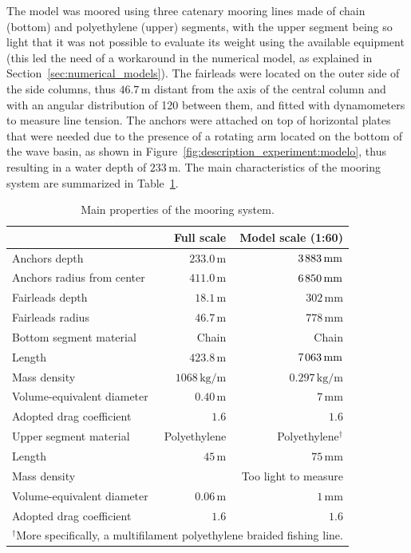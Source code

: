 The model was moored using three catenary mooring lines made of chain (bottom) and polyethylene (upper) segments, with the upper segment being so light that it was not possible to evaluate its weight using the available equipment (this led the need of a workaround in the numerical model, as explained in Section~\ref{sec:numerical_models}). The fairleads were located on the outer side of the side columns, thus $46.7\,\text{m}$ distant from the axis of the central column and with an angular distribution of 120\textdegree{} between them, and fitted with dynamometers to measure line tension. The anchors were attached on top of horizontal plates that were needed due to the presence of a rotating arm located on the bottom of the wave basin, as shown in Figure~\ref{fig:description_experiment:modelo}, thus resulting in a water depth of $233\,\text{m}$. The main characteristics of the mooring system are summarized in Table~\ref{tab:description_experiment:mooring_properties}. 
\begin{table}[!hbtp]
	\centering
	\caption{Main properties of the mooring system.} \label{tab:description_experiment:mooring_properties}
	\begin{tabular}{lrr}
		\toprule
		& Full scale & Model scale (1:60)\\
		\midrule
		Anchors depth & $233.0\,\text{m}$ & $3\mkern2mu883 \, \text{mm}$\\
		Anchors radius from center & $411.0 \, \text{m}$ & $6\mkern2mu850 \, \text{mm}$\\
		\midrule
		Fairleads depth & $18.1 \, \text{m}$ &  $302 \, \text{mm}$\\
		Fairleads radius & $46.7 \, \text{m}$ &  $778 \, \text{mm}$\\
		\midrule
		Bottom segment material & Chain & Chain\\
		Length &  $423.8 \, \text{m}$ & $7\mkern2mu063 \, \text{mm}$\\
		Mass density & $1068 \, \text{kg}/\text{m}$ & $0.297 \, \text{kg}/\text{m}$ \\
		Volume-equivalent diameter & $0.40\,\text{m}$ & $7\,\text{mm}$ \\
		Adopted drag coefficient & $1.6$ & $1.6$	\\
		\midrule
		Upper segment material & Polyethylene & Polyethylene$^\dagger$\\
		Length & $45 \, \text{m}$  & $75 \, \text{mm}$\\
		Mass density & \multicolumn{2}{r}{Too light to measure} \\
		Volume-equivalent diameter & $0.06\,\text{m}$ & $1\,\text{mm}$ \\
		Adopted drag coefficient & $1.6$ & $1.6$ \\
		\bottomrule        
        \multicolumn{3}{l}{\footnotesize $^\dagger $More specifically, a multifilament polyethylene braided fishing line.}
	\end{tabular}%
\end{table}%


